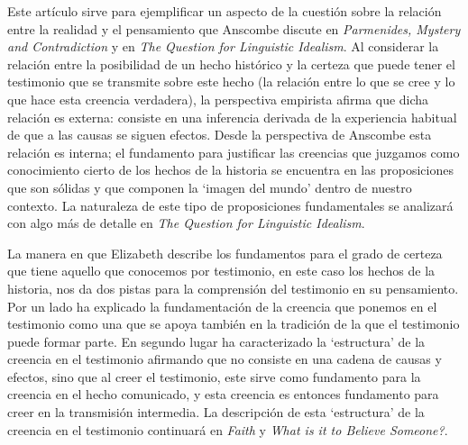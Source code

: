 \vspace{2.83334em}
Este artículo sirve para ejemplificar un aspecto de la cuestión sobre la relación entre la realidad y el pensamiento que Anscombe discute en \emph{Parmenides, Mystery and Contradiction} y en \emph{The Question for Linguistic Idealism}. Al considerar la relación entre la posibilidad de un hecho histórico y la certeza que puede tener el testimonio que se transmite sobre este hecho (la relación entre lo que se cree y lo que hace esta creencia verdadera), la perspectiva empirista afirma que dicha relación es externa: consiste en una inferencia derivada de la experiencia habitual de que a las causas se siguen efectos. Desde la perspectiva de Anscombe esta relación es interna; el fundamento para justificar las creencias que juzgamos como conocimiento cierto de los hechos de la historia se encuentra en las proposiciones que son sólidas y que componen la `imagen del mundo' dentro de nuestro contexto. La naturaleza de este tipo de proposiciones fundamentales se analizará con algo más de detalle en \emph{The Question for Linguistic Idealism}.

La manera en que Elizabeth describe los fundamentos para el grado de certeza que tiene aquello que conocemos por testimonio, en este caso los hechos de la historia, nos da dos pistas para la comprensión del testimonio en su pensamiento. Por un lado ha explicado la fundamentación de la creencia que ponemos en el testimonio como una que se apoya también en la tradición de la que el testimonio puede formar parte. En segundo lugar ha caracterizado la `estructura' de la creencia en el testimonio afirmando que no consiste en una cadena de causas y efectos, sino que al creer el testimonio, este sirve como fundamento para la creencia en el hecho comunicado, y esta creencia es entonces fundamento para creer en la transmisión intermedia. La descripción de esta `estructura' de la creencia en el testimonio continuará en \emph{Faith} y \emph{What is it to Believe Someone?}.
